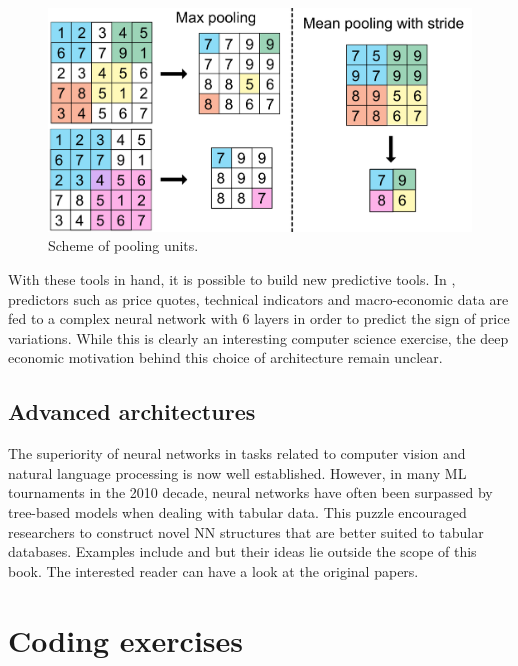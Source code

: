 \documentclass[]{krantz}
\theoremstyle{definition}
\theoremstyle{definition}
\theoremstyle{definition}
\theoremstyle{remark}
\begin{document}
\begin{figure}[H]

{\centering \includegraphics[width=500px]{images/cnn_pooling} 

}

\caption{Scheme of pooling units.}\label{fig:cnnpooling}
\end{figure}

With these tools in hand, it is possible to build new predictive tools.
In \citet{hoseinzade2019cnnpred}, predictors such as price quotes,
technical indicators and macro-economic data are fed to a complex neural
network with 6 layers in order to predict the sign of price variations.
While this is clearly an interesting computer science exercise, the deep
economic motivation behind this choice of architecture remain unclear.

\hypertarget{advanced-architectures}{%
\subsection{Advanced architectures}\label{advanced-architectures}}

The superiority of neural networks in tasks related to computer vision
and natural language processing is now well established. However, in
many ML tournaments in the 2010 decade, neural networks have often been
surpassed by tree-based models when dealing with tabular data. This
puzzle encouraged researchers to construct novel NN structures that are
better suited to tabular databases. Examples include
\citet{arik2019tabnet} and \citet{popov2019neural} but their ideas lie
outside the scope of this book. The interested reader can have a look at
the original papers.

\hypertarget{coding-exercises-4}{%
\section{Coding exercises}\label{coding-exercises-4}}
\end{document}
